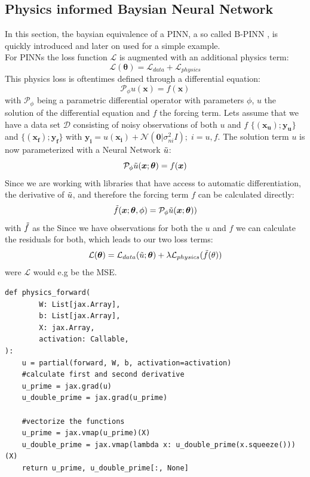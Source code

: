 \documentclass{article}
\begin{document}
\subsection{Physics informed Baysian Neural Network}
In this section, the baysian equivalence of a PINN, a so called B-PINN \cite{Yang_2021}, is quickly introduced and later on used for a simple example. \\
For PINNs the loss function $\mathcal{L}$ is augmented with an additional physics term:
\begin{equation}
    \mathcal{L}(\bm \theta) = \mathcal{L}_{data} + \mathcal{L}_{physics}
\end{equation}
This physics loss is oftentimes defined through a differential equation:
\begin{equation}
    \mathcal{P}_\phi u(\bm x) = f(\bm x)
\end{equation}
with $\mathcal{P}_\phi$ being a parametric differential operator with parameters $\phi$, $u$ the solution of the differential equation and $f$ the forcing term. Lets assume that we have a data set $\mathcal{D}$ consisting of noisy observations of both $u$ and $f$ $\{(\bm{x_u});\bm{y_u}\}$ and $\{(\bm{x_f});\bm{y_f}\}$ with $\bm{y_i} = u(\bm{x_i}) + \mathcal{N}(\bm{0}|\sigma_{ni}^2 I) ; \; i = u,f$. The solution term $u$ is now parameterized with a Neural Network $\Tilde{u}$:
\begin{equation}
    \mathcal{P}_\phi \Tilde{u}(\bm x; \bm \theta) = f(\bm x)
\end{equation}
Since we are working with libraries that have access to automatic differentiation, the derivative of $\Tilde{u}$, and therefore the forcing term $f$ can be calculated directly:
\begin{equation}
    \Tilde{f}(\bm x;\bm \theta, \phi) = \mathcal{P}_\phi \Tilde{u}(\bm x; \bm \theta))
\end{equation}
with $ \Tilde{f}$ as the 
Since we have observations for both the $u$ and $f$ we can calculate the residuals for both, which leads to our two loss terms:
\begin{equation}
    \mathcal{L}(\bm \theta) = \mathcal{L}_{data}(\Tilde{u}; \bm \theta) + \lambda \mathcal{L}_{physics}(\Tilde{f}(\theta))
\end{equation}
were $\mathcal{L}$ would e.g be the MSE.
\begin{lstlisting}[caption= {Physics Informed Neural Net},captionpos=t]
def physics_forward(
        W: List[jax.Array],
        b: List[jax.Array],
        X: jax.Array,
        activation: Callable,
):
    u = partial(forward, W, b, activation=activation)
    #calculate first and second derivative
    u_prime = jax.grad(u)
    u_double_prime = jax.grad(u_prime)

    #vectorize the functions
    u_prime = jax.vmap(u_prime)(X)
    u_double_prime = jax.vmap(lambda x: u_double_prime(x.squeeze()))(X)
    return u_prime, u_double_prime[:, None]
\end{lstlisting}
\end{document}
